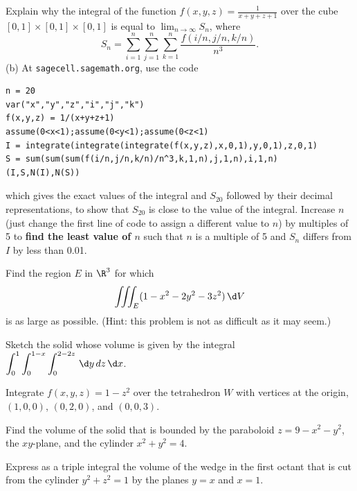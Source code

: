 \documentclass{watsonbook}
\begin{document}

\begin{aexercise}
  Explain why the integral of the function
  $f(x,y,z) = \frac{1}{x+y+z+1}$ over the cube
  $[0,1] \times [0,1] \times [0,1]$ is equal to
  $\lim_{n\to\infty} S_n$, where
  \[
    S_n = \sum_{i=1}^n \sum_{j=1}^n \sum_{k=1}^n
    \frac{f(i/n,j/n,k/n)}{n^3}.
  \]
  (b) At \texttt{sagecell.sagemath.org}, use the code
\begin{verbatim} 
n = 20
var("x","y","z","i","j","k")
f(x,y,z) = 1/(x+y+z+1)
assume(0<x<1);assume(0<y<1);assume(0<z<1)
I = integrate(integrate(integrate(f(x,y,z),x,0,1),y,0,1),z,0,1)
S = sum(sum(sum(f(i/n,j/n,k/n)/n^3,k,1,n),j,1,n),i,1,n)
(I,S,N(I),N(S))
\end{verbatim}
  which gives the exact values of the integral and $S_{20}$ followed
  by their decimal representations, to show that $S_{20}$ is close to
  the value of the integral. Increase $n$ (just change the first line
  of code to assign a different value to $n$) by multiples of 5 to
  \textbf{find the least value of $n$} such that $n$ is a multiple of
  5 and $S_n$ differs from $I$ by less than 0.01.
\end{aexercise}

\begin{aexercise}
  Find the region $E$ in $\R^3$ for which
  \[
    \iiint_E (1-x^2-2y^2-3z^2) \, {\d}V
  \]
  is as large as possible. (Hint: this problem is not as difficult as
  it may seem.)
\end{aexercise}


\begin{aexercise}
  Sketch the solid whose volume is given by the integral $\displaystyle{\int_0^1
    \int_0^{1-x}\int_0^{2-2z}\,\d y\,dz\,\d x}$.
\end{aexercise}

\begin{aexercise}
  Integrate $f(x,y,z) = 1-z^2$ over the tetrahedron $W$ with vertices
  at the origin, $(1,0,0)$, $(0,2,0)$, and $(0,0,3)$.
\end{aexercise}


\begin{aexercise}
  Find the volume of the solid that is bounded by the paraboloid
  $z = 9 - x^2 - y^2$, the $xy$-plane, and the cylinder
  $x^2 + y^2 = 4$.
\end{aexercise}

\begin{aexercise}
  Express as a triple integral the volume of the wedge in the first
  octant that is cut from the cylinder $y^2+z^2 = 1$ by the planes
  $y=x$ and $x=1$.
\end{aexercise}
\end{document}
